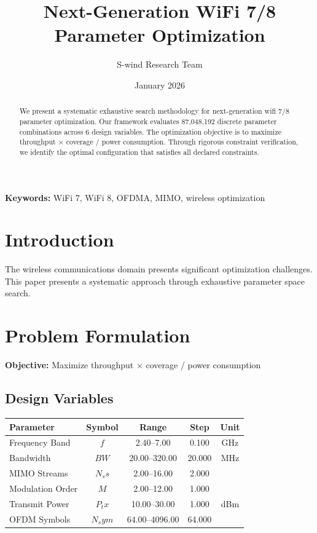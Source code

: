 \documentclass[11pt,a4paper]{article}
\title{Next-Generation WiFi 7/8 Parameter Optimization}
\author{S-wind Research Team}
\date{January 2026}
\begin{document}
\maketitle

\begin{abstract}
We present a systematic exhaustive search methodology for next-generation wifi 7/8 parameter optimization. Our framework evaluates 87,048,192 discrete parameter combinations across 6 design variables. The optimization objective is to maximize throughput × coverage / power consumption. Through rigorous constraint verification, we identify the optimal configuration that satisfies all declared constraints.
\end{abstract}

\textbf{Keywords:} WiFi 7, WiFi 8, OFDMA, MIMO, wireless optimization

\section{Introduction}

The wireless communications domain presents significant optimization challenges. This paper presents a systematic approach through exhaustive parameter space search.

\section{Problem Formulation}

\textbf{Objective:} Maximize throughput × coverage / power consumption

\subsection{Design Variables}

\begin{center}
\begin{tabular}{|l|c|c|c|c|}
\hline
Parameter & Symbol & Range & Step & Unit \\
\hline
Frequency Band & $f$ & 2.40--7.00 & 0.100 & GHz \\
Bandwidth & $BW$ & 20.00--320.00 & 20.000 & MHz \\
MIMO Streams & $N_ss$ & 2.00--16.00 & 2.000 &  \\
Modulation Order & $M$ & 2.00--12.00 & 1.000 &  \\
Transmit Power & $P_tx$ & 10.00--30.00 & 1.000 & dBm \\
OFDM Symbols & $N_sym$ & 64.00--4096.00 & 64.000 &  \\
\hline
\end{tabular}
\end{center}
\end{document}
